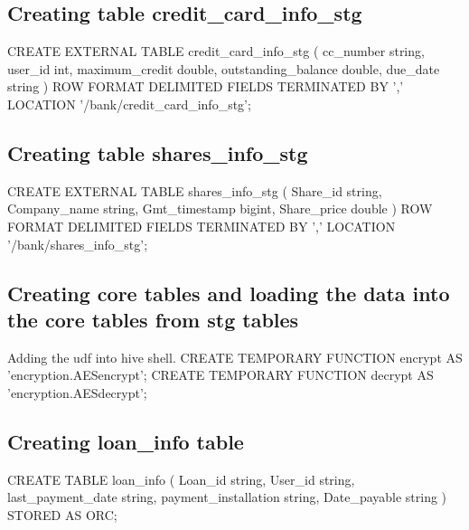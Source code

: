 \subsection{Creating table credit\_card\_info\_stg}

CREATE EXTERNAL TABLE \newline
credit\_card\_info\_stg ( \newline
cc\_number string, \newline
user\_id int, \newline
maximum\_credit double, \newline
outstanding\_balance double, \newline
due\_date string \newline
) ROW FORMAT DELIMITED FIELDS TERMINATED BY \newline
',' LOCATION '/bank/credit\_card\_info\_stg'; \newline

\subsection{Creating table shares\_info\_stg}

CREATE EXTERNAL TABLE shares\_info\_stg \newline
( \newline
Share\_id string, \newline
Company\_name string, \newline
Gmt\_timestamp bigint, \newline
Share\_price double \newline
) ROW FORMAT DELIMITED FIELDS TERMINATED BY \newline
',' LOCATION '/bank/shares\_info\_stg'; \newline

\subsection{Creating core tables and loading the data into the core tables from stg tables}
Adding the udf into hive shell. \newline
CREATE TEMPORARY FUNCTION encrypt AS 'encryption.AESencrypt';\newline
CREATE TEMPORARY FUNCTION decrypt AS 'encryption.AESdecrypt';\newline
\subsection{Creating loan\_info table}
CREATE TABLE loan\_info ( \newline
Loan\_id string, \newline
User\_id string, \newline
last\_payment\_date string, \newline
payment\_installation string, \newline
Date\_payable string \newline
) STORED AS ORC; \newline

